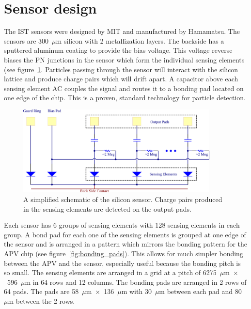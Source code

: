 \documentclass[preprint,12pt]{elsarticle}
\begin{document}
\section{Sensor design}
The IST sensors were designed by MIT and
manufactured by Hamamatsu. The sensors are 300~$\mu$m silicon with 2 metallization
layers. The backside has a sputtered aluminum coating to provide the bias voltage.
This voltage reverse biases the PN junctions in the sensor which form the individual
sensing elements (see figure~\ref{fig:sensor_sch}. Particles passing through the sensor will interact
with the silicon lattice and produce charge pairs which will drift apart. A capacitor
above each sensing element AC couples the signal and routes it to a bonding pad
located on one edge of the chip. This is a proven, standard technology for
particle detection.

\begin{figure}[h]
\begin{center}
\includegraphics[width=4in, keepaspectratio=true, angle=0]{graphics/sensor_sch.png}
\caption{A simplified schematic of the silicon sensor.  Charge pairs produced in
the sensing elements are detected on the output pads.
\label{fig:sensor_sch}}
\end{center}
\end{figure}
%
Each sensor has 6 groups of sensing elements with 128 sensing elements in each
group. A bond pad for each one of the sensing elements is grouped at one edge
of the sensor and is arranged in a pattern which mirrors the bonding pattern for
the APV chip (see figure~\ref{fig:bonding_pads}). This allows for much simpler bonding between the APV and the
sensor, especially useful because the bonding pitch is so small. The sensing
elements are arranged in a grid at a pitch of 6275~$\mu$m~$\times$~596~$\mu$m in 64 rows and 12
columns. The bonding pads are arranged in 2 rows of 64 pads. The pads are
58~$\mu$m~$\times$~136~$\mu$m with 30~$\mu$m between each pad and 80~$\mu$m between the 2 rows.
\end{document}
